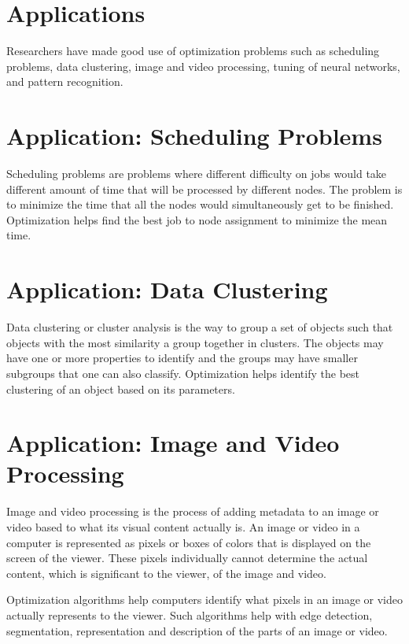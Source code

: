 \section{Applications}
\par Researchers have made good use of optimization problems such as scheduling problems, data clustering, image and video processing, tuning of neural networks, and pattern recognition.

\section{Application: Scheduling Problems}
\par Scheduling problems are problems where different difficulty on jobs would take different amount of time that will be processed by different nodes. The problem is to minimize the time that all the nodes would simultaneously get to be finished. Optimization helps find the best job to node assignment to minimize the mean time.

\section{Application: Data Clustering}
\par Data clustering or cluster analysis is the way to group a set of objects such that objects with the most similarity a group together in clusters. The objects may have one or more properties to identify and the groups may have smaller subgroups that one can also classify. Optimization helps identify the best clustering of an object based on its parameters.

\section{Application: Image and Video Processing}
\par Image and video processing is the process of adding metadata to an image or video based to what its visual content actually is. An image or video in a computer is represented as pixels or boxes of colors that is displayed on the screen of the viewer. These pixels individually cannot determine the actual content, which is significant to the viewer, of the image and video.

\par Optimization algorithms help computers identify what pixels in an image or video actually represents to the viewer. Such algorithms help with edge detection, segmentation, representation and description of the parts of an image or video.

